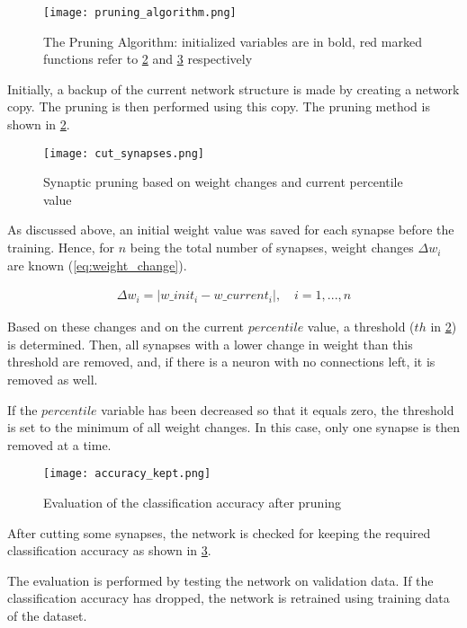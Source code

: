 \begin{figure}[H]
  \centering
  \texttt{[image: pruning\_algorithm.png]}
  \caption{The Pruning Algorithm: initialized variables are in bold, red marked functions refer to \ref{img:cut_synapses} and \ref{img:accuracy_kept} respectively}
  \label{img:pruning_algorithm}
\end{figure}

Initially, a backup of the current network structure is made by creating a network copy. The pruning is then performed using this copy. The pruning method is shown in \cref{img:cut_synapses}.

\begin{figure}[H]
  \centering
  \texttt{[image: cut\_synapses.png]}
  \caption{Synaptic pruning based on weight changes and current percentile value}
  \label{img:cut_synapses}
\end{figure}

As discussed above, an initial weight value was saved for each synapse before the training. Hence, for $ n $ being the total number of synapses, weight changes $ \Delta w_i $ are known (\ref{eq:weight_change}).

\begin{align} \label{eq:weight_change}
\Delta w_i = |w\_init_i - w\_current_i|, \quad i = 1, ..., n
\end{align}

Based on these changes and on the current $ percentile $ value, a threshold ($ th $ in \cref{img:cut_synapses}) is determined. Then, all synapses with a lower change in weight than this threshold are removed, and, if there is a neuron with no connections left, it is removed as well.

If the $ percentile $ variable has been decreased so that it equals zero, the threshold is set to the minimum of all weight changes. In this case, only one synapse is then removed at a time.

\begin{figure}[H]
  \centering
  \texttt{[image: accuracy\_kept.png]}
  \caption{Evaluation of the classification accuracy after pruning}
  \label{img:accuracy_kept}
\end{figure}

After cutting some synapses, the network is checked for keeping the required classification accuracy as shown in \cref{img:accuracy_kept}.

The evaluation is performed by testing the network on validation data. If the classification accuracy has dropped, the network is retrained using training data of the dataset.

